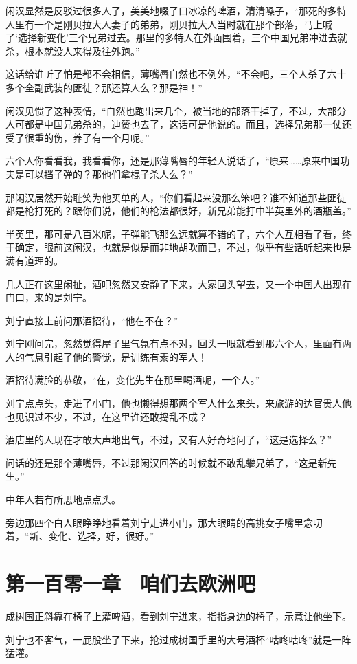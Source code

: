 闲汉显然是反驳过很多人了，美美地啜了口冰凉的啤酒，清清嗓子，“那死的多特人里有一个是刚贝拉大人妻子的弟弟，刚贝拉大人当时就在那个部落，马上喊了‘选择新变化’三个兄弟过去。那里的多特人在外面围着，三个中国兄弟冲进去就杀，根本就没人来得及往外跑。”

这话给谁听了怕是都不会相信，薄嘴唇自然也不例外，“不会吧，三个人杀了六十多个全副武装的匪徒？那还算人么？那是神！”

闲汉见惯了这种表情，“自然也跑出来几个，被当地的部落干掉了，不过，大部分人可都是中国兄弟杀的，迪赞也去了，这话可是他说的。而且，选择兄弟那一仗还受了很重的伤，养了有一个月呢。”

六个人你看看我，我看看你，还是那薄嘴唇的年轻人说话了，“原来……原来中国功夫是可以挡子弹的？那他们拿棍子杀人么？”

那闲汉居然开始耻笑为他买单的人，“你们看起来没那么笨吧？谁不知道那些匪徒都是枪打死的？跟你们说，他们的枪法都很好，新兄弟能打中半英里外的酒瓶盖。”

半英里，那可是八百米呢，子弹能飞那么远就算不错的了，六个人互相看了看，终于确定，眼前这闲汉，也就是似是而非地胡吹而已，不过，似乎有些话听起来也是满有道理的。

几人正在这里闲扯，酒吧忽然又安静了下来，大家回头望去，又一个中国人出现在门口，来的是刘宁。

刘宁直接上前问那酒招待，“他在不在？”

刘宁刚问完，忽然觉得屋子里气氛有点不对，回头一眼就看到那六个人，里面有两人的气息引起了他的警觉，是训练有素的军人！

酒招待满脸的恭敬，“在，变化先生在那里喝酒呢，一个人。”

刘宁点点头，走进了小门，他也懒得想那两个军人什么来头，来旅游的达官贵人他也见识过不少，不过，在这里谁还敢捣乱不成？

酒店里的人现在才敢大声地出气，不过，又有人好奇地问了，“这是选择么？”

问话的还是那个薄嘴唇，不过那闲汉回答的时候就不敢乱攀兄弟了，“这是新先生。”

中年人若有所思地点点头。

旁边那四个白人眼睁睁地看着刘宁走进小门，那大眼睛的高挑女子嘴里念叨着，“新、变化、选择，好，很好。”

\section{第一百零一章　咱们去欧洲吧}

成树国正斜靠在椅子上灌啤酒，看到刘宁进来，指指身边的椅子，示意让他坐下。

刘宁也不客气，一屁股坐了下来，抢过成树国手里的大号酒杯“咕咚咕咚”就是一阵猛灌。

